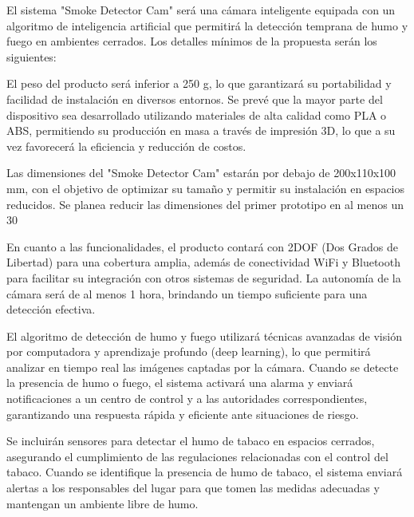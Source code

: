 El sistema "Smoke Detector Cam" será una cámara inteligente equipada con un algoritmo de inteligencia artificial que permitirá la detección temprana de humo y fuego en ambientes cerrados. Los detalles mínimos de la propuesta serán los siguientes:

El peso del producto será inferior a 250 g, lo que garantizará su portabilidad y facilidad de instalación en diversos entornos. Se prevé que la mayor parte del dispositivo sea desarrollado utilizando materiales de alta calidad como PLA o ABS, permitiendo su producción en masa a través de impresión 3D, lo que a su vez favorecerá la eficiencia y reducción de costos.

Las dimensiones del "Smoke Detector Cam" estarán por debajo de 200x110x100 mm, con el objetivo de optimizar su tamaño y permitir su instalación en espacios reducidos. Se planea reducir las dimensiones del primer prototipo en al menos un 30%

En cuanto a las funcionalidades, el producto contará con 2DOF (Dos Grados de Libertad) para una cobertura amplia, además de conectividad WiFi y Bluetooth para facilitar su integración con otros sistemas de seguridad. La autonomía de la cámara será de al menos 1 hora, brindando un tiempo suficiente para una detección efectiva.

El algoritmo de detección de humo y fuego utilizará técnicas avanzadas de visión por computadora y aprendizaje profundo (deep learning), lo que permitirá analizar en tiempo real las imágenes captadas por la cámara. Cuando se detecte la presencia de humo o fuego, el sistema activará una alarma y enviará notificaciones a un centro de control y a las autoridades correspondientes, garantizando una respuesta rápida y eficiente ante situaciones de riesgo.

Se incluirán sensores para detectar el humo de tabaco en espacios cerrados, asegurando el cumplimiento de las regulaciones relacionadas con el control del tabaco. Cuando se identifique la presencia de humo de tabaco, el sistema enviará alertas a los responsables del lugar para que tomen las medidas adecuadas y mantengan un ambiente libre de humo.

